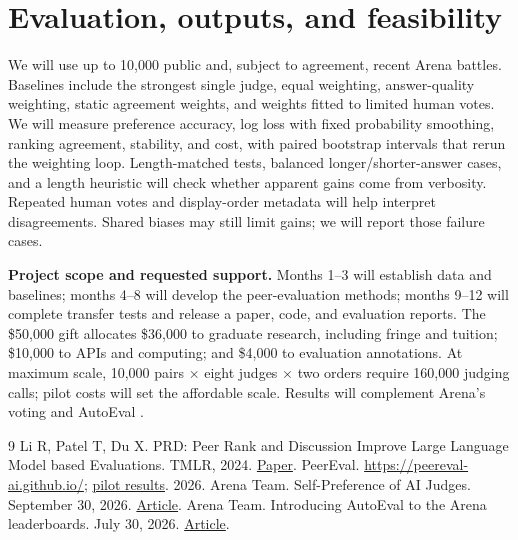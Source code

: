\documentclass[12pt,letterpaper]{article}
\newcommand{\hd}[1]{\ifhmode\par\fi\addvspace{4pt}\noindent\textbf{#1}\hspace{0.35em}}
\begin{document}
\section*{Evaluation, outputs, and feasibility}
We will use up to 10,000 public and, subject to agreement, recent Arena battles. Baselines include the strongest single judge, equal weighting, answer-quality weighting, static agreement weights, and weights fitted to limited human votes. We will measure preference accuracy, log loss with fixed probability smoothing, ranking agreement, stability, and cost, with paired bootstrap intervals that rerun the weighting loop. Length-matched tests, balanced longer/shorter-answer cases, and a length heuristic will check whether apparent gains come from verbosity. Repeated human votes and display-order metadata will help interpret disagreements. Shared biases may still limit gains; we will report those failure cases.

\hd{Project scope and requested support.}
Months 1--3 will establish data and baselines; months 4--8 will develop the peer-evaluation methods; months 9--12 will complete transfer tests and release a paper, code, and evaluation reports. The \$50,000 gift allocates \$36,000 to graduate research, including fringe and tuition; \$10,000 to APIs and computing; and \$4,000 to evaluation annotations. At maximum scale, 10,000 pairs $\times$ eight judges $\times$ two orders require 160,000 judging calls; pilot costs will set the affordable scale. Results will complement Arena's voting and AutoEval \citep{autoeval}.

\begingroup
\footnotesize
\begin{thebibliography}{9}
\setlength{\itemsep}{0pt}\setlength{\parskip}{0pt}
 Li R, Patel T, Du X. PRD: Peer Rank and Discussion Improve Large Language Model based Evaluations. TMLR, 2024. \href{https://arxiv.org/abs/2307.02762}{Paper}.
 PeerEval. \url{https://peereval-ai.github.io/}; \href{https://github.com/peereval-ai/peereval-ai.github.io/blob/main/figures_modified_du.json}{pilot results}. 2026.
 Arena Team. Self-Preference of AI Judges. September 30, 2026. \href{https://arena.ai/blog/llm-judge-self-preference}{Article}.
 Arena Team. Introducing AutoEval to the Arena leaderboards. July 30, 2026. \href{https://arena.ai/blog/autoeval-scores}{Article}.
\end{thebibliography}
\endgroup

\ifdefined\proposalonly\else
\newpage
\end{document}
